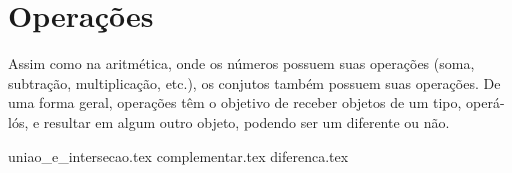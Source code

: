 \section{Operações}
Assim como na aritmética, onde os números possuem suas operações (soma, subtração,  multiplicação, etc.), os conjutos também possuem suas operações.
De uma forma geral, operações têm o objetivo de receber objetos de um tipo, operá-lós, e resultar em algum outro objeto, podendo ser um diferente ou não.

{uniao_e_intersecao.tex}
{complementar.tex}
{diferenca.tex}

